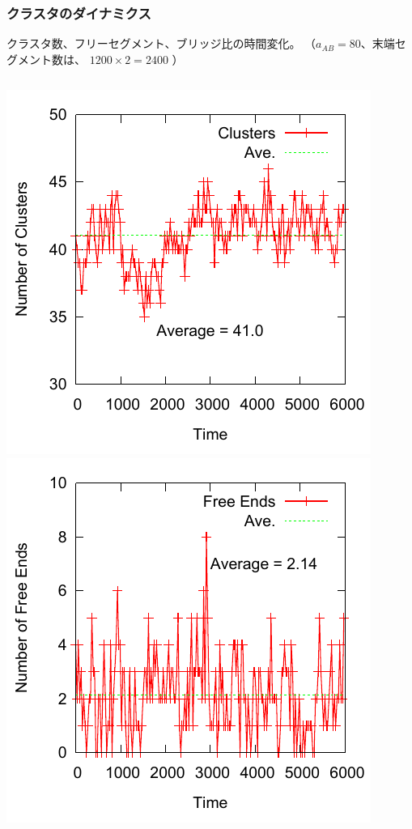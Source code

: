 \documentclass[12pt, dvipdfmx]{beamer}
\begin{document}
\begin{frame}
\frametitle{クラスタのダイナミクス}
クラスタ数、フリーセグメント、ブリッジ比の時間変化。
（$a_{AB}=80$、末端セグメント数は、
$1200\times2 = 2400$
）
\begin{columns}[T, totalwidth=\linewidth]
		\includegraphics[width=\columnwidth]{./fig/AB80/Domains.pdf}
		\includegraphics[width=\columnwidth]{./fig/AB80/Free_Ends.pdf}

\end{columns}
\end{frame}
\end{document}
